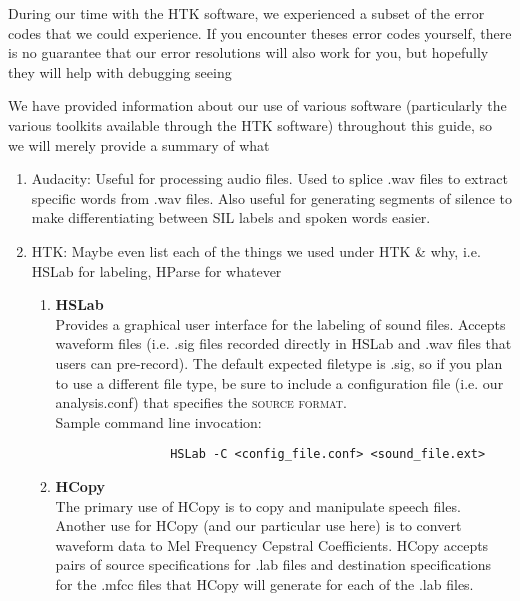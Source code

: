 \documentclass{wileySev}
\begin{document}
During our time with the HTK software, we experienced a subset of the error codes that we could experience. If you encounter theses error codes yourself, there is no guarantee that our error resolutions will also work for you, but hopefully they will help with debugging seeing 


We have provided information about our use of various software (particularly the various toolkits available through the HTK software) throughout this guide, so we will merely provide a summary of what 
\begin{enumerate}
	\item Audacity: Useful for processing audio files. Used to splice .wav files to extract specific words from .wav files. Also useful for generating segments of silence to make differentiating between SIL labels and spoken words easier.
	\item HTK: Maybe even list each of the things we used under HTK \& why, i.e. HSLab for labeling, HParse for whatever
		\begin{enumerate}
			\item \textbf{HSLab}\\
				Provides a graphical user interface for the labeling of sound files. Accepts waveform files (i.e. .sig files recorded directly in HSLab and .wav files that users can pre-record). The default expected filetype is .sig, so if you plan to use a different file type, be sure to include a configuration file (i.e. our analysis.conf) that specifies the \textsc{source format}.\\
				
				Sample command line invocation: 
				\begin{verbatim}
				HSLab -C <config_file.conf> <sound_file.ext>
				\end{verbatim}
			\item \textbf{HCopy}\\
				The primary use of HCopy is to copy and manipulate speech files. Another use for HCopy (and our particular use here) is to convert waveform data to Mel Frequency Cepstral Coefficients.
				HCopy accepts pairs of source specifications for .lab files and destination specifications for the .mfcc files that HCopy will generate for each of the .lab files.
				

\end{enumerate}
\end{enumerate}
\end{document}
